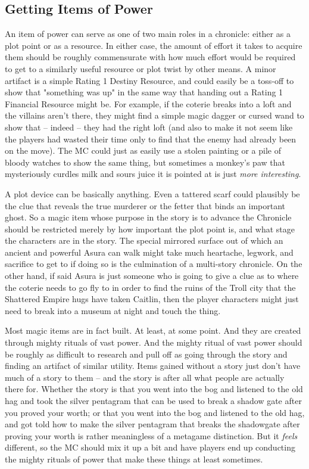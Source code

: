 \subsection{Getting Items of Power}

An item of power can serve as one of two main roles in a chronicle: either as a plot point or as a resource. In either case, the amount of effort it takes to acquire them should be roughly commensurate with how much effort would be required to get to a similarly useful resource or plot twist by other means. A minor artifact is a simple Rating 1 Destiny Resource, and could easily be a toss-off to show that "something was up" in the same way that handing out a Rating 1 Financial Resource might be. For example, if the coterie breaks into a loft and the villains aren't there, they might find a simple magic dagger or cursed wand to show that -- indeed -- they had the right loft (and also to make it not seem like the players had wasted their time only to find that the enemy had already been on the move). The MC could just as easily use a stolen painting or a pile of bloody watches to show the same thing, but sometimes a monkey's paw that mysteriously curdles milk and sours juice it is pointed at is just \textit{more interesting}.

A plot device can be basically anything. Even a tattered scarf could plausibly be the clue that reveals the true murderer or the fetter that binds an important ghost. So a magic item whose purpose in the story is to advance the Chronicle should be restricted merely by how important the plot point is, and what stage the characters are in the story. The special mirrored surface out of which an ancient and powerful Asura can walk might take much heartache, legwork, and sacrifice to get to if doing so is the culmination of a multi-story chronicle. On the other hand, if said Asura is just someone who is going to give a clue as to where the coterie needs to go fly to in order to find the ruins of the Troll city that the Shattered Empire hugs have taken Caitlin, then the player characters might just need to break into a museum at night and touch the thing.

Most magic items are in fact built. At least, at some point. And they are created through mighty rituals of vast power. And the mighty ritual of vast power should be roughly as difficult to research and pull off as going through the story and finding an artifact of similar utility. Items gained without a story just don't have much of a story to them -- and the story is after all what people are actually there for. Whether the story is that you went into the bog and listened to the old hag and took the silver pentagram that can be used to break a shadow gate after you proved your worth; or that you went into the bog and listened to the old hag, and got told how to make the silver pentagram that breaks the shadowgate after proving your worth is rather meaningless of a metagame distinction. But it \textit{feels} different, so the MC should mix it up a bit and have players end up conducting the mighty rituals of power that make these things at least sometimes. 

